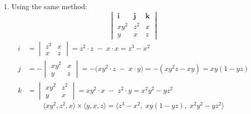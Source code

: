 \begin{example}
\begin{solution}
\begin{enumerate}
   \item Using the same method:
   \[
   \begin{vmatrix}
   \mathbf{i} & \mathbf{j} & \mathbf{k} \\
   xy^2 & z^2 & x \\
   y & x & z
   \end{vmatrix}
   \]
   \[
   \begin{aligned}
   i &= \begin{vmatrix} z^2 & x \\ x & z \end{vmatrix}
       = z^2 \cdot z \;-\; x \cdot x
       = z^3 - x^2 \\[1ex]
   j &= -\begin{vmatrix} xy^2 & x \\ y & z \end{vmatrix}
       = -\bigl(xy^2 \cdot z \;-\; x \cdot y\bigr)
       = -(xy^2z - xy)
       = xy(1 - yz) \\[1ex]
   k &= \begin{vmatrix} xy^2 & z^2 \\ y & x \end{vmatrix}
       = xy^2 \cdot x \;-\; z^2 \cdot y
       = x^2y^2 - yz^2
   \end{aligned}
   \]
   \[
   \langle xy^2, z^2, x\rangle \times \langle y, x, z\rangle 
   = \langle z^3 - x^2, \; xy(1-yz), \; x^2y^2 - yz^2 \rangle
   \]
\end{enumerate}
\end{solution}
\end{example}
\exampleline



